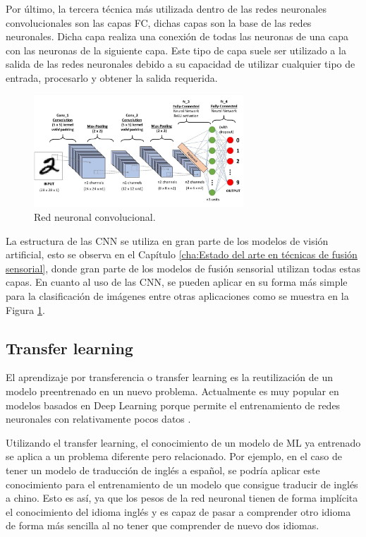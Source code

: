Por último, la tercera técnica más utilizada dentro de las redes neuronales convolucionales son las capas \acl{FC}, dichas capas son la base de las redes neuronales. Dicha capa realiza una conexión de todas las neuronas de una capa con las neuronas de la siguiente capa. Este tipo de capa suele ser utilizado a la salida de las redes neuronales debido a su capacidad de utilizar cualquier tipo de entrada, procesarlo y obtener la salida requerida.

\begin{figure}[H]
    \centering
    \includegraphics[width=0.7\textwidth]{Book/figures/5_deteccion2d/CNN.jpeg}
    \caption{Red neuronal convolucional.}
    \label{fig:Red neuronal convolucional.}
\end{figure}

La estructura de las \ac{CNN} se utiliza en gran parte de los modelos de visión artificial, esto se observa en el Capítulo \ref{cha:Estado del arte en técnicas de fusión sensorial}, donde gran parte de los modelos de fusión sensorial utilizan todas estas capas. En cuanto al uso de las \ac{CNN}, se pueden aplicar en su forma más simple para la clasificación de imágenes entre otras aplicaciones como se muestra en la Figura \ref{fig:Red neuronal convolucional.}.

\subsection{Transfer learning}
\label{sec:Transfer learning}

El aprendizaje por transferencia o transfer learning es la reutilización de un modelo preentrenado en un nuevo problema. Actualmente es muy popular en modelos basados en Deep Learning porque permite el entrenamiento de redes neuronales con relativamente pocos datos \cite{what_tl}. 

Utilizando el transfer learning, el conocimiento de un modelo de \ac{ML} ya entrenado se aplica a un problema diferente pero relacionado. Por ejemplo, en el caso de tener un modelo de traducción de inglés a español, se podría aplicar este conocimiento para el entrenamiento de un modelo que consigue traducir de inglés a chino. Esto es así, ya que los pesos de la red neuronal tienen de forma implícita el conocimiento del idioma inglés y es capaz de pasar a comprender otro idioma de forma más sencilla al no tener que comprender de nuevo dos idiomas.

